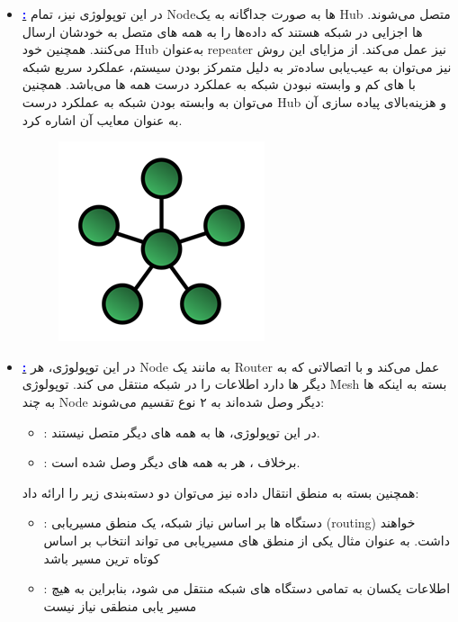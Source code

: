 \documentclass[]{article}
\newcommand{\link}[2]{\href{#1}{\textcolor{blue}{#2}}}
\begin{document}
\begin{itemize}
\begin{figure}[H]
	\end{figure}
	\item \link{https://en.wikipedia.org/wiki/Star_network}{\textbf{\lr{Star Topology}:}} در این توپولوژی نیز، تمام Nodeها به صورت جداگانه به یک Hub متصل می‌شوند. ها اجزایی در شبکه هستند که داده‌ها را به همه های متصل به خودشان ارسال می‌کنند. همچنین خود Hub به‌عنوان repeater نیز عمل می‌کند.
	از مزایای این روش نیز می‌توان به عیب‌یابی ساده‌تر به دلیل متمرکز بودن سیستم، عملکرد سریع شبکه با های کم و وابسته نبودن شبکه به عملکرد درست همه ها می‌باشد. همچنین می‌توان به وابسته بودن شبکه به عملکرد درست Hub و هزینه‌بالای پیاده سازی آن به عنوان معایب آن اشاره کرد.
	\begin{figure}[H]
		\centerline{\includegraphics[scale=0.8]{resources/star.png}}
	\end{figure}
	\item \link{https://en.wikipedia.org/wiki/Mesh_networking}{\textbf{\lr{Mesh Topology}:}} در این توپولوژی، هر Node به مانند یک Router عمل می‌کند و با اتصالاتی که به دیگر ها دارد اطلاعات را در شبکه منتقل می کند. توپولوژی Mesh بسته به اینکه ها به چند Node دیگر وصل شده‌اند به ۲ نوع تقسیم می‌شوند:
	\begin{itemize}
		\item {}: در این توپولوژی، ها به همه های دیگر متصل نیستند.
		\item {}: برخلاف ، هر  به همه های دیگر وصل شده است.
	\end{itemize}
	همچنین بسته به منطق انتقال داده نیز می‌توان دو دسته‌بندی زیر را ارائه داد:
	\begin{itemize}
		\item {}:  دستگاه ها بر اساس نیاز شبکه، یک منطق مسیریابی (routing) خواهند داشت. به عنوان مثال یکی از منطق های مسیریابی می تواند انتخاب بر اساس کوتاه ترین مسیر باشد
		\item {}:  اطلاعات یکسان به تمامی دستگاه های شبکه منتقل می شود، بنابراین به هیچ مسیر یابی منطقی نیاز نیست

\end{itemize}
\end{itemize}
\end{document}
